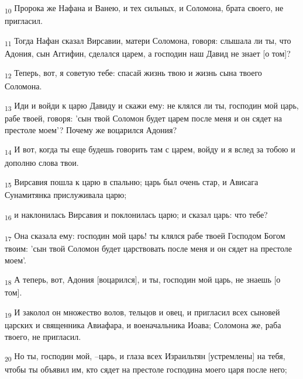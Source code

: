 \begin{tcolorbox}
\textsubscript{10} Пророка же Нафана и Ванею, и тех сильных, и Соломона, брата своего, не пригласил.
\end{tcolorbox}
\begin{tcolorbox}
\textsubscript{11} Тогда Нафан сказал Вирсавии, матери Соломона, говоря: слышала ли ты, что Адония, сын Аггифин, сделался царем, а господин наш Давид не знает [о том]?
\end{tcolorbox}
\begin{tcolorbox}
\textsubscript{12} Теперь, вот, я советую тебе: спасай жизнь твою и жизнь сына твоего Соломона.
\end{tcolorbox}
\begin{tcolorbox}
\textsubscript{13} Иди и войди к царю Давиду и скажи ему: не клялся ли ты, господин мой царь, рабе твоей, говоря: 'сын твой Соломон будет царем после меня и он сядет на престоле моем'? Почему же воцарился Адония?
\end{tcolorbox}
\begin{tcolorbox}
\textsubscript{14} И вот, когда ты еще будешь говорить там с царем, войду и я вслед за тобою и дополню слова твои.
\end{tcolorbox}
\begin{tcolorbox}
\textsubscript{15} Вирсавия пошла к царю в спальню; царь был очень стар, и Ависага Сунамитянка прислуживала царю;
\end{tcolorbox}
\begin{tcolorbox}
\textsubscript{16} и наклонилась Вирсавия и поклонилась царю; и сказал царь: что тебе?
\end{tcolorbox}
\begin{tcolorbox}
\textsubscript{17} Она сказала ему: господин мой царь! ты клялся рабе твоей Господом Богом твоим: 'сын твой Соломон будет царствовать после меня и он сядет на престоле моем'.
\end{tcolorbox}
\begin{tcolorbox}
\textsubscript{18} А теперь, вот, Адония [воцарился], и ты, господин мой царь, не знаешь [о том].
\end{tcolorbox}
\begin{tcolorbox}
\textsubscript{19} И заколол он множество волов, тельцов и овец, и пригласил всех сыновей царских и священника Авиафара, и военачальника Иоава; Соломона же, раба твоего, не пригласил.
\end{tcolorbox}
\begin{tcolorbox}
\textsubscript{20} Но ты, господин мой, --царь, и глаза всех Израильтян [устремлены] на тебя, чтобы ты объявил им, кто сядет на престоле господина моего царя после него;
\end{tcolorbox}
